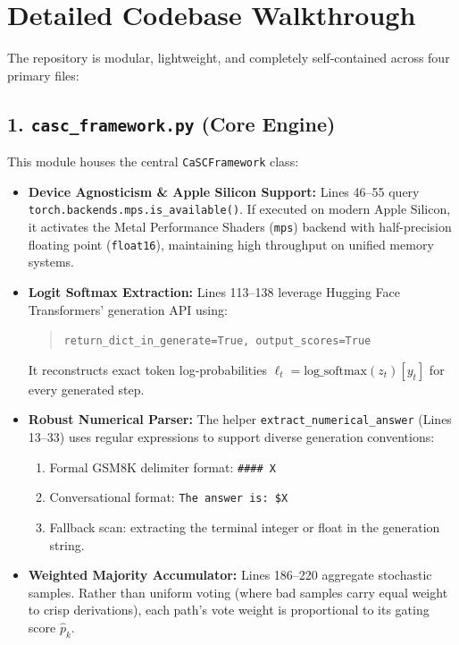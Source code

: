 \documentclass[11pt,a4paper]{article}
\begin{document}
\section{Detailed Codebase Walkthrough}

The repository is modular, lightweight, and completely self-contained across four primary files:

\subsection{1. \texttt{casc\_framework.py} (Core Engine)}
This module houses the central \texttt{CaSCFramework} class:
\begin{itemize}[leftmargin=*]
    \item \textbf{Device Agnosticism \& Apple Silicon Support:} Lines 46--55 query \texttt{torch.backends.mps.is\_available()}. If executed on modern Apple Silicon, it activates the Metal Performance Shaders (\texttt{mps}) backend with half-precision floating point (\texttt{float16}), maintaining high throughput on unified memory systems.
    \item \textbf{Logit Softmax Extraction:} Lines 113--138 leverage Hugging Face Transformers' generation API using:
    \begin{quote}
    \texttt{return\_dict\_in\_generate=True, output\_scores=True}
    \end{quote}
    It reconstructs exact token log-probabilities $\ell_t = \text{log\_softmax}(z_t)[y_t]$ for every generated step.
    \item \textbf{Robust Numerical Parser:} The helper \texttt{extract\_numerical\_answer} (Lines 13--33) uses regular expressions to support diverse generation conventions:
    \begin{enumerate}
        \item Formal GSM8K delimiter format: \texttt{\#\#\#\# X}
        \item Conversational format: \texttt{The answer is: \$X}
        \item Fallback scan: extracting the terminal integer or float in the generation string.
    \end{enumerate}
    \item \textbf{Weighted Majority Accumulator:} Lines 186--220 aggregate stochastic samples. Rather than uniform voting (where bad samples carry equal weight to crisp derivations), each path's vote weight is proportional to its gating score $\hat{p}_k$.
\end{itemize}
\end{document}
